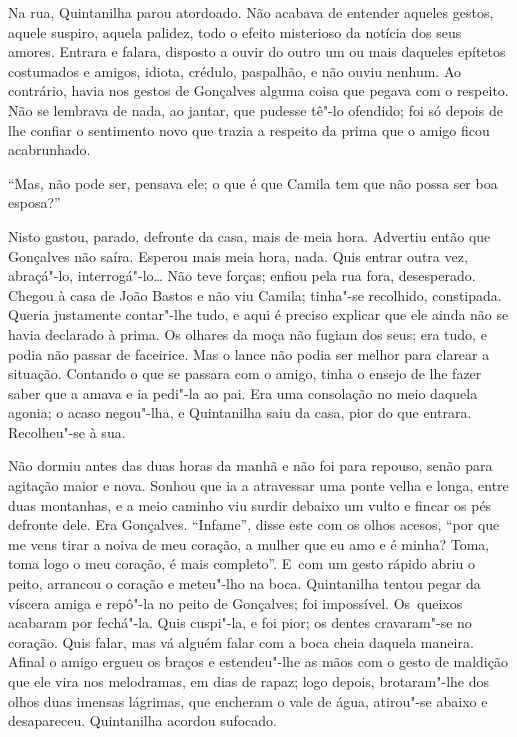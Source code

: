 \begin{linenumbers}
Na rua, Quintanilha parou atordoado. Não acabava de entender aqueles
gestos, aquele suspiro, aquela palidez, todo o efeito misterioso da
notícia dos seus amores. Entrara e falara, disposto a ouvir do outro um
ou mais daqueles epítetos costumados e amigos, idiota, crédulo,
paspalhão, e não ouviu nenhum. Ao contrário, havia nos gestos de
Gonçalves alguma coisa que pegava com o respeito. Não se lembrava de
nada, ao jantar, que pudesse tê"-lo ofendido; foi só depois de lhe
confiar o sentimento novo que trazia a respeito da prima que o amigo
ficou acabrunhado.

``Mas, não pode ser, pensava ele; o que é que Camila tem que não possa
ser boa esposa?''

Nisto gastou, parado, defronte da casa, mais de meia hora. Advertiu
então que Gonçalves não saíra. Esperou mais meia hora, nada. Quis entrar
outra vez, abraçá"-lo, interrogá"-lo\ldots{} Não teve forças; enfiou pela rua
fora, desesperado. Chegou à casa de João Bastos e não viu Camila;
tinha"-se recolhido, constipada. Queria justamente contar"-lhe tudo, e
aqui é preciso explicar que ele ainda não se havia declarado à prima. Os
olhares da moça não fugiam dos seus; era tudo, e podia não passar de
faceirice. Mas o lance não podia ser melhor para clarear a situação.
Contando o que se passara com o amigo, tinha o ensejo de lhe fazer saber
que a amava e ia pedi"-la ao pai. Era uma consolação no meio daquela
agonia; o acaso negou"-lha, e Quintanilha saiu da casa, pior do que
entrara. Recolheu"-se à sua.

Não dormiu antes das duas horas da manhã e não foi para repouso, senão
para agitação maior e nova. Sonhou que ia a atravessar uma ponte velha e
longa, entre duas montanhas, e a meio caminho viu surdir debaixo um
vulto e fincar os pés defronte dele. Era Gonçalves. ``Infame'', disse
este com os olhos acesos, ``por que me vens tirar a noiva de meu
coração, a mulher que eu amo e é minha? Toma, toma logo o meu coração, é
mais completo''. E~com um gesto rápido abriu o peito, arrancou o coração
e meteu"-lho na boca. Quintanilha tentou pegar da víscera amiga e repô"-la
no peito de Gonçalves; foi impossível. Os~queixos acabaram por fechá"-la.
Quis cuspi"-la, e foi pior; os dentes cravaram"-se no coração. Quis falar,
mas vá alguém falar com a boca cheia daquela maneira. Afinal o amigo
ergueu os braços e estendeu"-lhe as mãos com o gesto de maldição que ele
vira nos melodramas, em dias de rapaz; logo depois, brotaram"-lhe dos
olhos duas imensas lágrimas, que encheram o vale de água, atirou"-se
abaixo e desapareceu. Quintanilha acordou sufocado.


\end{linenumbers}
